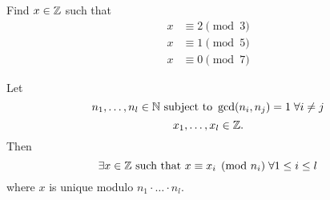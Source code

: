 \documentclass[NumTh.tex]{subfiles}
\begin{document}
\begin{ex}
Find $x \in \mathbb{Z}$ such that 
\begin{align}
x &\equiv 2 \pmod{3}\\
x &\equiv 1 \pmod{5}\\
x &\equiv 0 \pmod{7}
\end{align}
\end{ex}

\begin{theorem} Let
\[ n_1,\dots,n_l \in \mathbb{N} \text{ subject to } \gcd (n_i,n_j) = 1 \;\forall i\neq j \]
\[ x_1, \dots, x_l \in \mathbb{Z} \text{.} \]
Then
\[ \exists x \in \mathbb{Z} \text{ such that } x \equiv x_i \pmod{n_i} \; \forall 1\leq i \leq l \]
where $x$ is unique modulo $n_1 \cdot \dots \cdot n_l$.
\end{theorem}
\end{document}
